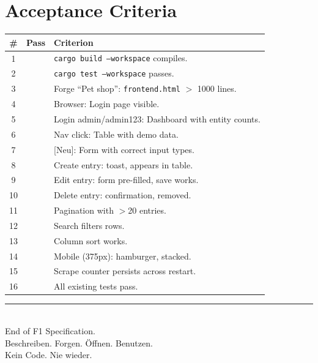 \documentclass[11pt,a4paper]{article}
\begin{document}
\section{Acceptance Criteria}
\begin{longtable}{clp{9cm}}
\toprule
\# & Pass & Criterion \\
\midrule
1 & & \texttt{cargo build --workspace} compiles. \\
2 & & \texttt{cargo test --workspace} passes. \\
3 & & Forge ``Pet shop'': \texttt{frontend.html} $>$ 1000 lines. \\
4 & & Browser: Login page visible. \\
5 & & Login admin/admin123: Dashboard with entity counts. \\
6 & & Nav click: Table with demo data. \\
7 & & [Neu]: Form with correct input types. \\
8 & & Create entry: toast, appears in table. \\
9 & & Edit entry: form pre-filled, save works. \\
10 & & Delete entry: confirmation, removed. \\
11 & & Pagination with $>$20 entries. \\
12 & & Search filters rows. \\
13 & & Column sort works. \\
14 & & Mobile (375px): hamburger, stacked. \\
15 & & Scrape counter persists across restart. \\
16 & & All existing tests pass. \\
\bottomrule
\end{longtable}

\vfill
\begin{center}
\color{isls-gray}\rule{0.5\textwidth}{0.4pt}\\[0.5em]
{\small End of F1 Specification.\\[0.3em]
Beschreiben. Forgen. \"Offnen. Benutzen.\\Kein Code. Nie wieder.}
\end{center}
\end{document}
